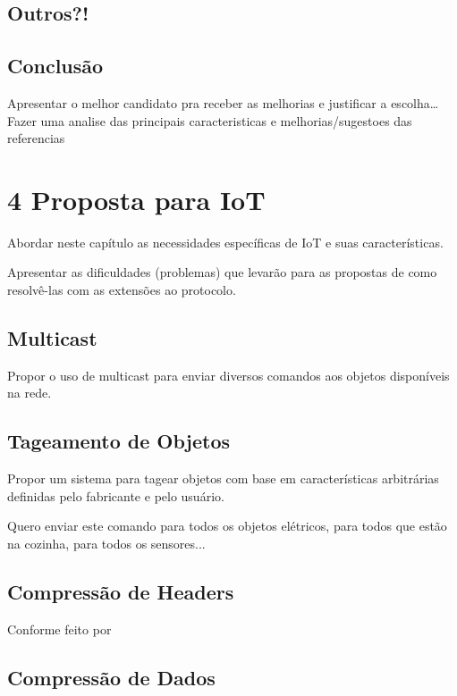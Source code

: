 \documentclass[twoside,english,brazilian]{UNISINOSmonografia}
\begin{document}
	
	\section{Outros?!}
	
	
	\section{Conclusão}
	
		Apresentar o melhor candidato pra receber as melhorias e justificar
		a escolha\ldots
		Fazer uma analise das principais caracteristicas e melhorias/sugestoes das referencias



\chapter{4 Proposta para IoT}

	Abordar neste capítulo as necessidades específicas de IoT e suas 
	características.
	
	Apresentar as dificuldades (problemas) que levarão para as propostas
	de como resolvê-las com as extensões ao protocolo.
	
	
	\section{Multicast}
		
		Propor o uso de multicast para enviar diversos comandos aos objetos
		disponíveis na rede.
		
		
	\section{Tageamento de Objetos}
		
		Propor um sistema para tagear objetos com base em características
		arbitrárias definidas pelo fabricante e pelo usuário.
		
		Quero enviar este comando para todos os objetos elétricos, para
		todos que estão na cozinha, para todos os sensores...
		
		
	\section{Compressão de Headers}
		
		Conforme feito por \cite{Choi2009}
		
		
	\section{Compressão de Dados}
		
\end{document}
